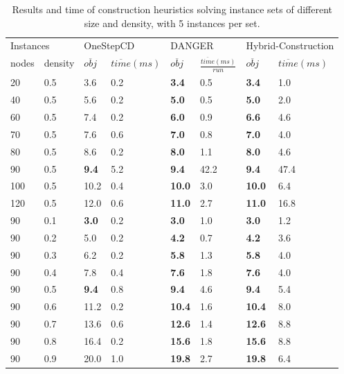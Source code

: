       \begin{table}[h]
      \caption{Results and time of construction heuristics solving instance sets of different size and density, with 5 instances per set.}
\begin{center}
      \begin{tabular}{|l|l||l|l||l|l||l|l||}\hline
      \multicolumn{2}{|l||}{Instances}&\multicolumn{2}{|l||}{OneStepCD}&\multicolumn{2}{|l||}{DANGER}&\multicolumn{2}{|l|}{Hybrid-Construction}\\
      \cline{1-8}
      nodes & density & $\overline{obj}$ & $\overline{time}(ms)$ & $\overline{obj}$ & $\frac{\overline{time}(ms)}{run}$ & $\overline{obj}$ & $\overline{time}(ms)$\\
      \hline
	  20 & 0.5 		& 3.6 & 0.2 		 	& \textbf{3.4} & 0.5  	& \textbf{3.4} & 1.0\\
	  40 & 0.5 		& 5.6 & 0.2 		 	& \textbf{5.0} & 0.5  	& \textbf{5.0} & 2.0\\
	  60 & 0.5 		& 7.4 & 0.2 		 	& \textbf{6.0} & 0.9  	& \textbf{6.6} & 4.6\\
	  70 & 0.5 		& 7.6 & 0.6 		 	& \textbf{7.0} & 0.8  	& \textbf{7.0} & 4.0\\
	  80 & 0.5 		& 8.6 & 0.2 		 	& \textbf{8.0} & 1.1  	& \textbf{8.0} & 4.6\\
	  90 & 0.5 		& \textbf{9.4} & 5.2  	& \textbf{9.4} & 42.2  	& \textbf{9.4} & 47.4\\
	  100 & 0.5 	& 10.2 & 0.4 		 	& \textbf{10.0} & 3.0  	& \textbf{10.0} & 6.4\\
	  120 & 0.5 	& 12.0 & 0.6 		 	& \textbf{11.0} & 2.7  	& \textbf{11.0} & 16.8\\
	  	  
	  90 & 0.1 		& \textbf{3.0} & 0.2 		 	& \textbf{3.0} & 1.0  	& \textbf{3.0} & 1.2\\
	  90 & 0.2 		& 5.0 & 0.2 		  			& \textbf{4.2} & 0.7  	& \textbf{4.2} & 3.6\\
	  90 & 0.3 		& 6.2 & 0.2 		 			& \textbf{5.8} & 1.3  	& \textbf{5.8} & 4.0\\
	  90 & 0.4 		& 7.8 & 0.4 		 			& \textbf{7.6} & 1.8  	& \textbf{7.6} & 4.0\\
	  90 & 0.5 		& \textbf{9.4} & 0.8 		 	& \textbf{9.4} & 4.6  	& \textbf{9.4} & 5.4\\
	  90 & 0.6 		& 11.2 & 0.2 		 			& \textbf{10.4} & 1.6  	& \textbf{10.4} & 8.0\\
	  90 & 0.7 		& 13.6 & 0.6 		 			& \textbf{12.6} & 1.4  	& \textbf{12.6} & 8.8\\
	  90 & 0.8 		& 16.4 & 0.2 		 			& \textbf{15.6} & 1.8  	& \textbf{15.6} & 8.8\\
	  90 & 0.9 		& 20.0 & 1.0 		 			& \textbf{19.8} & 2.7  	& \textbf{19.8} & 6.4\\
	  \hline
	  \end{tabular}
\end{center}
      \label{tab:constructionComparePCP}
      \end{table}


